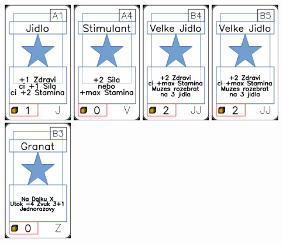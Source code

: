 \documentclass[a4paper]{article}
\begin{document}
	\includegraphics[width=3.0cm]{img-1_0}
	\includegraphics[width=3.0cm]{img-1_63}
	\includegraphics[width=3.0cm]{img-1_38}
	\includegraphics[width=3.0cm]{img-1_39}
	\includegraphics[width=3.0cm]{img-1_97}
\end{document}
